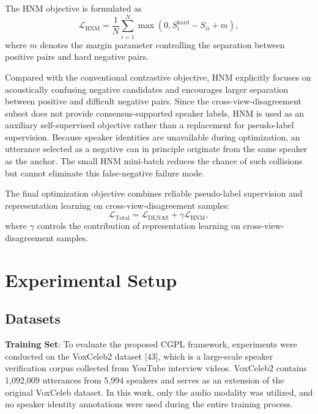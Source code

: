\documentclass[journal]{IEEEtran}
\begin{document}
The HNM objective is formulated as
\begin{equation}
\mathcal{L}_{\mathrm{HNM}}
=
\frac{1}{N}
\sum_{i=1}^{N}
\max
\left(
0,
S_i^{\mathrm{hard}}
-
S_{ii}
+
m
\right),
\end{equation}
where $m$ denotes the margin parameter controlling the separation
between positive pairs and hard negative pairs.

Compared with the conventional contrastive objective, HNM explicitly
focuses on acoustically confusing negative candidates and encourages
larger separation between positive and difficult negative pairs.
Since the cross-view-disagreement subset does not provide consensus-supported speaker labels,
HNM is used as an auxiliary self-supervised objective rather than a
replacement for pseudo-label supervision.
Because speaker identities are unavailable during optimization, an
utterance selected as a negative can in principle originate from the same
speaker as the anchor. The small HNM mini-batch reduces the chance of such
collisions but cannot eliminate this false-negative failure mode.

The final optimization objective combines reliable pseudo-label
supervision and representation learning on cross-view-disagreement samples:
\begin{equation}
\mathcal{L}_{\mathrm{Total}}
=
\mathcal{L}_{\mathrm{DLNAS}}
+
\gamma
\mathcal{L}_{\mathrm{HNM}},
\end{equation}
where $\gamma$ controls the contribution of representation learning on cross-view-disagreement samples.

\section{Experimental Setup}

\subsection{Datasets}

\textbf{Training Set}: 
To evaluate the proposed CGPL framework, experiments were conducted on the VoxCeleb2 dataset [43], which is a large-scale speaker verification corpus collected from YouTube interview videos. VoxCeleb2 contains 1,092,009 utterances from 5,994 speakers and serves as an extension of the original VoxCeleb dataset. In this work, only the audio modality was utilized, and no speaker identity annotations were used during the entire training process.
\end{document}
